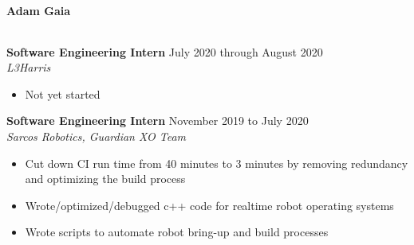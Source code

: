 \documentclass{article}
\begin{document}
\begin{center}
{\huge\textbf{Adam Gaia}}
\end{center}

\begin{center}
\begin{tabular}{ c c c }

\end{tabular}
\end{center}



\noindent \textbf{Software Engineering Intern} \hfill  July 2020 through August 2020 \\
\textit{L3Harris}
\begin{itemize}
    \item Not yet started \\
\end{itemize}


\noindent \textbf{Software Engineering Intern} \hfill  November 2019 to July 2020 \\
\textit{Sarcos Robotics, Guardian XO Team}
\begin{itemize}
    \item Cut down CI run time from 40 minutes to 3 minutes by removing redundancy and optimizing the build process
    \item Wrote/optimized/debugged c++ code for realtime robot operating systems
    \item Wrote scripts to automate robot bring-up and build processes \\
\end{itemize}
\end{document}
